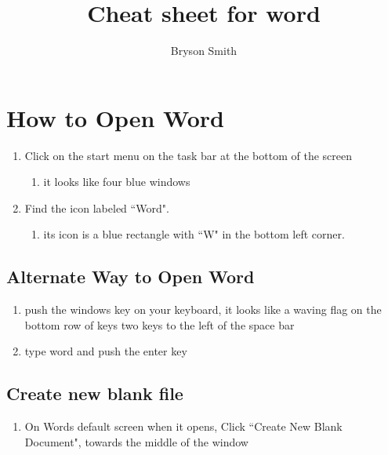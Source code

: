 \documentclass[12pt,letterpaper]{article}
\title{Cheat sheet for word}
\author{Bryson Smith}
\begin{document}
\section{How to Open Word}

\begin{enumerate}
\item Click on the start menu on the task bar at the bottom of the screen
	\begin{enumerate}
	    \item it looks like four blue windows
	\end{enumerate}
\item Find the icon labeled ``Word".
	\begin{enumerate}
	    \item its icon is a blue rectangle with ``W" in the bottom left corner.
	\end{enumerate}
\end{enumerate}
\subsection{Alternate Way to Open Word}
\begin{enumerate}
    \item push the windows key on your keyboard, it looks like a waving flag on the bottom row of keys two keys to the left of the space bar
    \item type word and push the enter key
\end{enumerate}
\subsection{Create new blank file}
\begin{enumerate}
\item On Words default screen when it opens, Click ``Create New Blank Document", towards the middle of the window
\end{enumerate}
\end{document}
